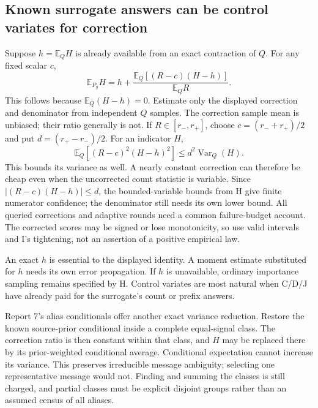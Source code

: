 \documentclass[10pt,a4paper]{article}
\newcommand{\E}{\mathbb E}
\begin{document}
\subsection{Known surrogate answers can be control variates for correction}
Suppose $h=\E_QH$ is already available from an exact contraction of $Q$. For any fixed scalar $c$,
\begin{equation}
 \E_{P_y}H=h+
       \frac{\E_Q[(R-c)(H-h)]}{\E_QR}.
 \label{eq:correction-control-variate}
\end{equation}
This follows because $\E_Q(H-h)=0$. Estimate only the displayed correction and denominator from independent
$Q$ samples. The correction sample mean is unbiased; their ratio generally is not. If $R\in[r_-,r_+]$,
choose $c=(r_-+r_+)/2$ and put $d=(r_+-r_-)/2$. For an indicator $H$,
\[
 \E_Q[(R-c)^2(H-h)^2]\leq d^2\operatorname{Var}_Q(H).
\]
This bounds its variance as well. A nearly constant correction can therefore be cheap even when the
uncorrected count statistic is variable. Since $|(R-c)(H-h)|\leq d$, the bounded-variable bounds from H
give finite numerator confidence; the denominator still needs its own lower bound. All queried corrections
and adaptive rounds need a common failure-budget account. The corrected scores may be signed or lose
monotonicity, so use valid intervals and I's tightening, not an assertion of a positive empirical law.

An exact $h$ is essential to the displayed identity. A moment estimate substituted for $h$ needs its own
error propagation. If $h$ is unavailable, ordinary importance sampling remains specified by H.
Control variates are most natural when C/D/J have already paid for the surrogate's count or prefix answers.

Report 7's alias conditionals offer another exact variance reduction. Restore the known source-prior
conditional inside a complete equal-signal class. The correction ratio is then constant within that class,
and $H$ may be replaced there by its prior-weighted conditional average. Conditional expectation
cannot increase its variance. This preserves irreducible message ambiguity; selecting one representative
message would not. Finding and summing the classes is still charged, and partial classes must be explicit
disjoint groups rather than an assumed census of all aliases.
\end{document}
